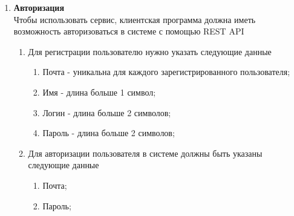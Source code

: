 

\begin{enumerate}
		
		\item \textbf{Авторизация\\}
		Чтобы использовать сервис, клиентская программа должна иметь возможность авторизоваться в системе с помощью REST API
		\begin{enumerate}
			\item Для регистрации пользователю нужно указать следующие данные 
			\begin{enumerate}
			    \item Почта - уникальна для каждого зарегистрированного пользователя; 
			    \item Имя - длина больше 1 символ;
			    \item Логин - длина больше 2 символов;
			    \item Пароль - длина больше 2 символов;
			\end{enumerate}
			\item Для авторизации пользователя в системе должны быть указаны следующие данные
			\begin{enumerate}
			    \item Почта;
			    \item Пароль;
			\end{enumerate}
		\end{enumerate}
		

\end{enumerate}
